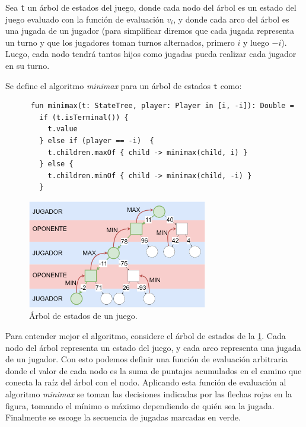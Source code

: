   \begin{definition}
    Sea \texttt{t} un árbol de estados del juego, donde cada nodo del árbol es un estado del juego
    evaluado con la función de evaluación \(v_i\), y donde cada arco del árbol es una jugada de un
    jugador (para simplificar diremos que cada jugada representa un turno y que los jugadores 
    toman turnos alternados, primero \(i\) y luego \(-i\)).
    Luego, cada nodo tendrá tantos hijos como jugadas pueda realizar cada jugador en su turno.

    Se define el algoritmo \textit{minimax} para un árbol de estados \texttt{t} como:
    
    \begin{verbatim}
      fun minimax(t: StateTree, player: Player in [i, -i]): Double =
        if (t.isTerminal()) {
          t.value
        } else if (player == -i)  {
          t.children.maxOf { child -> minimax(child, i) }
        } else {
          t.children.minOf { child -> minimax(child, -i) }
        } 
    \end{verbatim}
  \end{definition}

  
  \begin{figure}[ht!]
    \centering
    \includegraphics[width=0.7\textwidth]{img/minimax.drawio.png}
    \caption{Árbol de estados de un juego.}
    \label{fig:minimax-tree}
  \end{figure}

  Para entender mejor el algoritmo, considere el árbol de estados de la 
  \cref{fig:minimax-tree}.
  Cada nodo del árbol representa un estado del juego, y cada arco representa una jugada de un 
  jugador.
  Con esto podemos definir una función de evaluación arbitraria donde el valor de cada nodo
  es la suma de puntajes acumulados en el camino que conecta la raíz del árbol con el nodo.
  Aplicando esta función de evaluación al algoritmo \textit{minimax} se toman las decisiones
  indicadas por las flechas rojas en la figura, tomando el mínimo o máximo dependiendo de quién
  sea la jugada.
  Finalmente se escoge la secuencia de jugadas marcadas en verde.